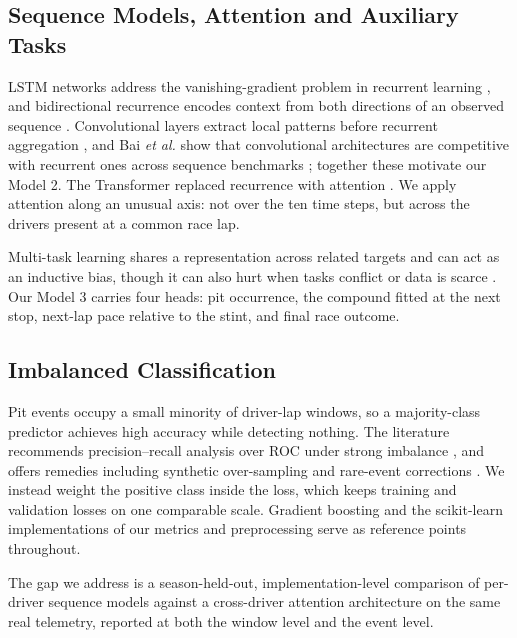 \documentclass[conference]{IEEEtran}
\begin{document}
\subsection{Sequence Models, Attention and Auxiliary Tasks}

LSTM networks address the vanishing-gradient problem in recurrent learning \cite{hochreiter1997lstm}, and bidirectional recurrence encodes context from both directions of an observed sequence \cite{schuster1997brnn,lipton2015lstm}. Convolutional layers extract local patterns before recurrent aggregation \cite{lecun1998cnn}, and Bai \emph{et al.} show that convolutional architectures are competitive with recurrent ones across sequence benchmarks \cite{bai2018tcn}; together these motivate our Model 2. The Transformer replaced recurrence with attention \cite{vaswani2017attention}. We apply attention along an unusual axis: not over the ten time steps, but across the drivers present at a common race lap.

Multi-task learning shares a representation across related targets and can act as an inductive bias, though it can also hurt when tasks conflict or data is scarce \cite{caruana1997multitask}. Our Model 3 carries four heads: pit occurrence, the compound fitted at the next stop, next-lap pace relative to the stint, and final race outcome.

\subsection{Imbalanced Classification}

Pit events occupy a small minority of driver-lap windows, so a majority-class predictor achieves high accuracy while detecting nothing. The literature recommends precision--recall analysis over ROC under strong imbalance \cite{saito2015pr,davis2006prroc,he2009imbalanced}, and offers remedies including synthetic over-sampling and rare-event corrections \cite{chawla2002smote,kingzeng2001rare}. We instead weight the positive class inside the loss, which keeps training and validation losses on one comparable scale. Gradient boosting \cite{friedman2001gbm} and the scikit-learn implementations of our metrics and preprocessing \cite{pedregosa2011sklearn} serve as reference points throughout.

The gap we address is a season-held-out, implementation-level comparison of per-driver sequence models against a cross-driver attention architecture on the same real telemetry, reported at both the window level and the event level.
\end{document}

